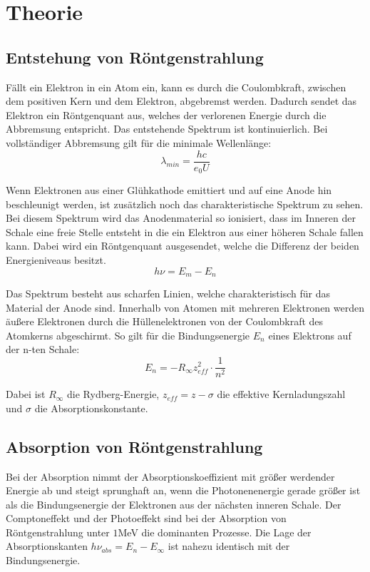 \section{Theorie}
\label{sec:Theorie}

\subsection{Entstehung von Röntgenstrahlung}

Fällt ein Elektron in ein Atom ein, kann es durch die Coulombkraft, zwischen dem positiven Kern
und dem Elektron, abgebremst werden. Dadurch sendet das Elektron ein Röntgenquant  aus, welches der
verlorenen Energie durch die Abbremsung entspricht. Das entstehende Spektrum ist kontinuierlich.
Bei vollständiger Abbremsung gilt für die minimale Wellenlänge:
\begin{equation}
  \lambda_{min} = \frac{h c}{e_0 U}
\end{equation}

Wenn Elektronen aus einer Glühkathode emittiert und auf eine Anode hin beschleunigt werden, ist zusätzlich
noch das charakteristische Spektrum zu sehen. Bei diesem Spektrum wird das Anodenmaterial so ionisiert, dass im Inneren
der Schale eine freie Stelle entsteht in die ein Elektron aus einer höheren Schale fallen kann. Dabei wird
ein Röntgenquant ausgesendet, welche die Differenz der beiden Energieniveaus besitzt.
\begin{equation}
  h \nu = E_m - E_n
\end{equation}

Das Spektrum besteht aus scharfen Linien, welche charakteristisch für das Material der Anode sind.
Innerhalb von Atomen mit mehreren Elektronen werden äußere Elektronen durch die Hüllenelektronen von
der Coulombkraft des Atomkerns abgeschirmt.
So gilt für die Bindungsenergie $E_n$ eines Elektrons auf der n-ten Schale:
\begin{equation}
  E_n = -R_{\infty} z_{eff}^2 \cdot \frac{1}{n^2}
\end{equation}

Dabei ist $R_{\infty}$ die Rydberg-Energie, $z_{eff} = z - \sigma$ die effektive Kernladungszahl und $\sigma$ die Absorptionskonstante.

\subsection{Absorption von Röntgenstrahlung}
Bei der Absorption nimmt der Absorptionskoeffizient mit größer werdender Energie ab und steigt sprunghaft an, wenn
die Photonenenergie gerade größer ist als die Bindungsenergie der Elektronen aus der nächsten inneren Schale. Der
Comptoneffekt und der Photoeffekt sind bei der Absorption von Röntgenstrahlung unter $1$MeV die dominanten Prozesse.
Die Lage der Absorptionskanten $h \nu_{abs} = E_n - E_{\infty}$ ist nahezu identisch mit der Bindungsenergie.

